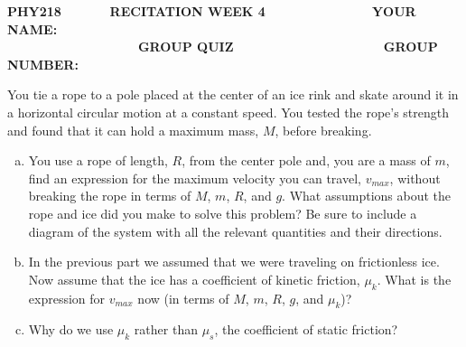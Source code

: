 \documentclass[11pt]{article}
\begin{document}
\bf{PHY218} \ \ \ \ \ \ \bf{RECITATION WEEK 4} \ \ \ \ \ \ \ \ \ \ \ \ \ \ \bf{YOUR NAME:}
\\

\ \ \ \ \ \ \ \ \ \ \ \ \ \ \ \ \ \ \bf{GROUP QUIZ} \ \ \ \ \ \ \ \ \ \ \ \ \ \ \ \ \ \ \ \ \bf{GROUP NUMBER:}

\noindent\makebox[\linewidth]{\rule{\paperwidth}{0.4pt}}

You tie a rope to a pole placed at the center of an ice rink and skate around it in a 
horizontal circular motion at a constant speed. You tested the rope's strength and found that
it can hold a maximum mass, $M$, before breaking.

\begin{enumerate}[(a)]
\item You use a rope of length, $R$, from the center pole and, you are a mass of $m$, find 
an expression for the maximum velocity you can travel, $v_{max}$, without breaking the rope 
in terms of $M$, $m$, $R$, and $g$. What assumptions about the rope and ice did you make to 
solve this problem? Be sure to include a diagram of the system with all the relevant
quantities and their directions.


\item In the previous part we assumed that we were traveling on frictionless ice. Now assume
that the ice has a coefficient of kinetic friction, $\mu_k$. What is the expression for 
$v_{max}$ now (in terms of $M$, $m$, $R$, $g$, and $\mu_k$)? 

\item Why do we use $\mu_k$ rather than $\mu_s$, the coefficient of static friction?

\end{enumerate}
\end{document}
